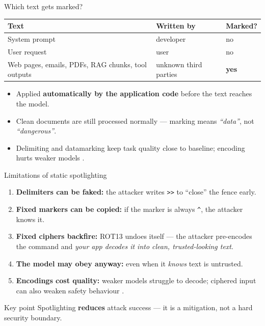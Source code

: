 \documentclass[aspectratio=169,11pt]{beamer}
\begin{document}
\begin{frame}{Which text gets marked?}
  \centering
  \begin{tabular}{@{}lll@{}}
    \toprule
    \textbf{Text} & \textbf{Written by} & \textbf{Marked?} \\
    \midrule
    System prompt & developer & no \\
    User request & user & no \\
    Web pages, emails, PDFs, RAG chunks, tool outputs & unknown third parties & \textbf{yes} \\
    \bottomrule
  \end{tabular}
  \vspace{1em}
  \begin{itemize}
    \item Applied \textbf{automatically by the application code} before the text reaches the model.
    \item Clean documents are still processed normally --- marking means \emph{``data''}, not \emph{``dangerous''}.
    \item Delimiting and datamarking keep task quality close to baseline; encoding hurts weaker models \cite{hines2024spotlighting}.
  \end{itemize}
\end{frame}

\begin{frame}{Limitations of static spotlighting}
  \begin{enumerate}
    \item \textbf{Delimiters can be faked:} the attacker writes \texttt{>>} to ``close'' the fence early.
    \item \textbf{Fixed markers can be copied:} if the marker is always \texttt{\^{}}, the attacker knows it.
    \item \textbf{Fixed ciphers backfire:} ROT13 undoes itself --- the attacker pre-encodes the command and \emph{your app decodes it into clean, trusted-looking text}.
    \item \textbf{The model may obey anyway:} even when it \emph{knows} text is untrusted.
    \item \textbf{Encodings cost quality:} weaker models struggle to decode; ciphered input can also weaken safety behaviour \cite{yuan2024cipherchat}.
  \end{enumerate}
  \begin{alertblock}{Key point}
    Spotlighting \textbf{reduces} attack success --- it is a mitigation, not a hard security boundary.
  \end{alertblock}
\end{frame}
\end{document}
